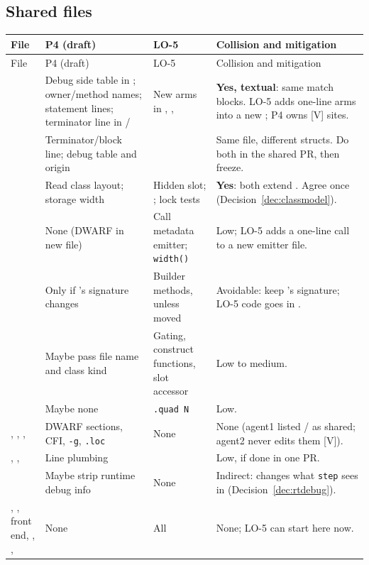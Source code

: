 \documentclass[10pt]{article}
\newcommand{\code}[1]{\texttt{\small #1}}
\newcommand{\mV}{\textsf{\scriptsize[V]}}
\begin{document}
\subsection{Shared files}\label{sec:ov-hotspots}
\begin{xltabular}{\linewidth}{@{}L{2.6cm}L{3.6cm}L{3.6cm}Y@{}}
\toprule
File & P4 (draft) & LO-5 & Collision and mitigation \\
\midrule
\endfirsthead
\toprule File & P4 (draft) & LO-5 & Collision and mitigation \\ \midrule
\endhead
{} & Debug side table in ; owner/method names; statement lines; terminator line in / & New arms in , ,  & \textbf{Yes, textual}: same match blocks. LO-5 adds one-line arms into a new ; P4 owns  \mV{} sites. \\
 & Terminator/block line;  debug table and origin &  & Same file, different structs. Do both in the shared PR, then freeze. \\
 & Read class layout; storage width & Hidden slot; ; lock tests & \textbf{Yes}: both extend . Agree once (Decision~\ref{dec:classmodel}). \\
 & None (DWARF in new file) & Call metadata emitter; \code{width()} & Low; LO-5 adds a one-line call to a new emitter file. \\
 & Only if 's signature changes & Builder methods, unless moved & Avoidable: keep 's signature; LO-5 code goes in . \\
 & Maybe pass file name and class kind & Gating, construct functions, slot accessor & Low to medium. \\
 & Maybe none & \code{.quad N} & Low. \\
, , ,  & DWARF sections, CFI, \code{-g}, \code{.loc} & None & None (agent1 listed / as shared; agent2 never edits them \mV). \\
, ,  & Line plumbing &  & Low, if done in one PR. \\
 & Maybe strip runtime debug info & None & Indirect: changes what \code{step} sees in  (Decision~\ref{dec:rtdebug}). \\
, , front end, , ,  & None & All & None; LO-5 can start here now. \\
\bottomrule
\end{xltabular}
\end{document}

